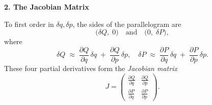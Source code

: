 \textbf{2. The Jacobian Matrix}

To first order in \(\delta q,\delta p\), the sides of the parallelogram are
\[
\bigl(\delta Q,\;0\bigr)
\quad\text{and}\quad
\bigl(0,\;\delta P\bigr),
\]
where
\[
\delta Q 
\;\approx\;
\frac{\partial Q}{\partial q}\,\delta q
\;+\;
\frac{\partial Q}{\partial p}\,\delta p,
\quad
\delta P 
\;\approx\;
\frac{\partial P}{\partial q}\,\delta q
\;+\;
\frac{\partial P}{\partial p}\,\delta p.
\]
These four partial derivatives form the \emph{Jacobian matrix}
\[
J
=
\begin{pmatrix}
\displaystyle \frac{\partial Q}{\partial q}
&\displaystyle \frac{\partial Q}{\partial p}\\[6pt]
\displaystyle \frac{\partial P}{\partial q}
&\displaystyle \frac{\partial P}{\partial p}
\end{pmatrix}.
\]

